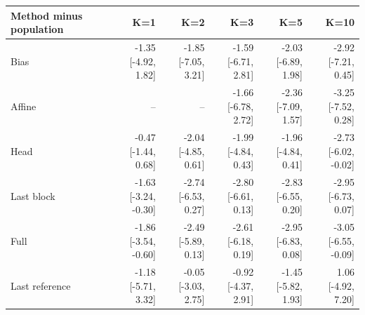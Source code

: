 \documentclass[11pt]{article}
\begin{document}
\begin{table}[!htbp]\centering\scriptsize\setlength{\tabcolsep}{3pt}
\begin{tabular}{lrrrrr}\toprule
Method minus population & K=1 & K=2 & K=3 & K=5 & K=10\\\midrule
Bias & \shortstack{-1.35\\{[-4.92, 1.82]}} & \shortstack{-1.85\\{[-7.05, 3.21]}} & \shortstack{-1.59\\{[-6.71, 2.81]}} & \shortstack{-2.03\\{[-6.89, 1.98]}} & \shortstack{-2.92\\{[-7.21, 0.45]}}\\
Affine & -- & -- & \shortstack{-1.66\\{[-6.78, 2.72]}} & \shortstack{-2.36\\{[-7.09, 1.57]}} & \shortstack{-3.25\\{[-7.52, 0.28]}}\\
Head & \shortstack{-0.47\\{[-1.44, 0.68]}} & \shortstack{-2.04\\{[-4.85, 0.61]}} & \shortstack{-1.99\\{[-4.84, 0.43]}} & \shortstack{-1.96\\{[-4.84, 0.41]}} & \shortstack{-2.73\\{[-6.02, -0.02]}}\\
Last block & \shortstack{-1.63\\{[-3.24, -0.30]}} & \shortstack{-2.74\\{[-6.53, 0.27]}} & \shortstack{-2.80\\{[-6.61, 0.13]}} & \shortstack{-2.83\\{[-6.55, 0.20]}} & \shortstack{-2.95\\{[-6.73, 0.07]}}\\
Full & \shortstack{-1.86\\{[-3.54, -0.60]}} & \shortstack{-2.49\\{[-5.89, 0.13]}} & \shortstack{-2.61\\{[-6.18, 0.19]}} & \shortstack{-2.95\\{[-6.83, 0.08]}} & \shortstack{-3.05\\{[-6.55, -0.09]}}\\
Last reference & \shortstack{-1.18\\{[-5.71, 3.32]}} & \shortstack{-0.05\\{[-3.03, 2.75]}} & \shortstack{-0.92\\{[-4.37, 2.91]}} & \shortstack{-1.45\\{[-5.82, 1.93]}} & \shortstack{1.06\\{[-4.92, 7.20]}}\\

\end{tabular}
\end{table}
\end{document}
